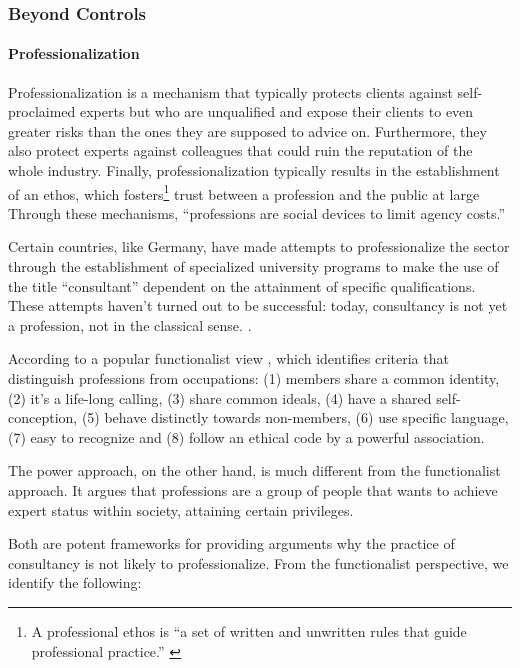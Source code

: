 \documentclass[12pt]{article}
\begin{document}
\hypertarget{beyond-controls}{%
\subsubsection{Beyond Controls}\label{beyond-controls}}

\hypertarget{professionalization}{%
\paragraph{Professionalization}\label{professionalization}}

Professionalization is a mechanism that typically protects clients
against self-proclaimed experts but who are unqualified and expose their
clients to even greater risks than the ones they are supposed to advice
on. \citep[ 71]{kieser2006} Furthermore, they also protect experts
against colleagues that could ruin the reputation of the whole industry.
Finally, professionalization typically results in the establishment of
an ethos, which fosters\footnote{A professional ethos is ``a set of
  written and unwritten rules that guide professional practice.''
  \citep{enstad2017}} trust between a profession and the public at large
\citep{sokolowski1991} Through these mechanisms, ``professions are
social devices to limit agency costs.'' \citep[ 276]{shapiro2005}

Certain countries, like Germany, have made attempts to professionalize
the sector through the establishment of specialized university programs
to make the use of the title ``consultant'' dependent on the attainment
of specific qualifications. These attempts haven't turned out to be
successful: today, consultancy is not yet a profession, not in the
classical sense. \citep[ 73]{kieser2006}.

According to a popular functionalist view \citep{goode1957}, which
identifies criteria that distinguish professions from occupations: (1)
members share a common identity, (2) it's a life-long calling, (3) share
common ideals, (4) have a shared self-conception, (5) behave distinctly
towards non-members, (6) use specific language, (7) easy to recognize
and (8) follow an ethical code by a powerful association.

The power approach, on the other hand, is much different from the
functionalist approach. It argues that professions are a group of people
that wants to achieve expert status within society, attaining certain
privileges. \citep[ 75]{kieser2006}

Both are potent frameworks for providing arguments why the practice of
consultancy is not likely to professionalize. From the functionalist
perspective, we identify the following:
\end{document}
